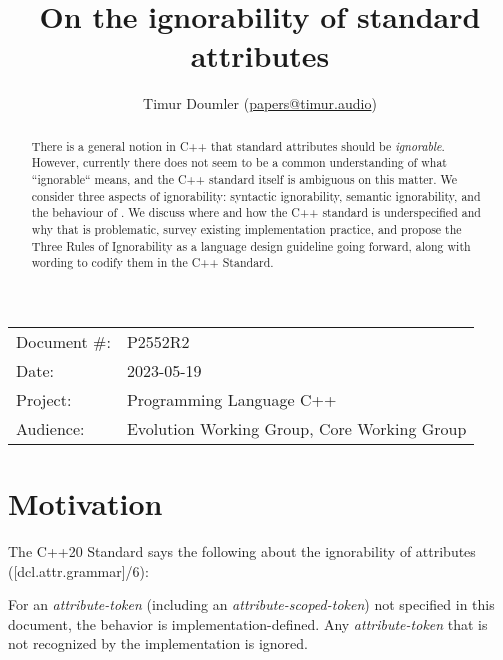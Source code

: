 

\newcommand{\forceindent}{\parindent=1em\indent\parindent=0pt\relax} %


\title{On the ignorability of standard attributes}
\author{
  Timur Doumler \small(\href{mailto:papers@timur.audio}{papers@timur.audio})
}
\date{}
\maketitle

\begin{tabular}{ll}
Document \#: & P2552R2 \\
Date: & 2023-05-19\\
Project: & Programming Language C++ \\
Audience: & Evolution Working Group, Core Working Group
\end{tabular}


\begin{abstract}
There is a general notion in C++ that standard attributes should be \emph{ignorable}. However, currently there does not seem to be a common understanding of what ``ignorable`` means, and the C++ standard itself is ambiguous on this matter. We consider three aspects of ignorability: syntactic ignorability, semantic ignorability, and the behaviour of \mbox{}. We discuss where and how the C++ standard is underspecified and why that is problematic, survey existing implementation practice, and propose the Three Rules of Ignorability as a language design guideline going forward, along with wording to codify them in the C++ Standard.
\end{abstract}


\section{Motivation}
\label{sec:motivation}


The C++20 Standard says the following about the ignorability of attributes ([dcl.attr.grammar]/6):

\begin{adjustwidth}{0.5cm}{0.5cm}
For an \emph{attribute-token} (including an \emph{attribute-scoped-token})  not specified in this document, the behavior is implementation-defined. Any \emph{attribute-token} that is not recognized by the implementation is ignored.
\end{adjustwidth}

